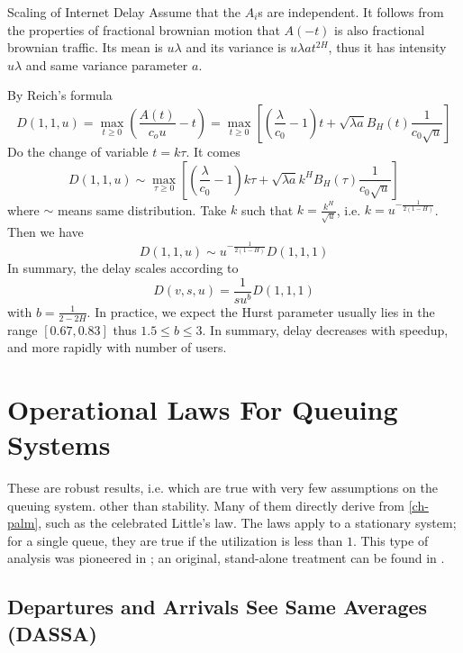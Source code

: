 \begin{ex}{Scaling of
Internet Delay}
Assume that the $A_i$s are independent. It follows from the properties of fractional brownian
motion that $A(-t)$ is also fractional brownian traffic. Its mean is $u \lambda$ and its
variance is $u \lambda a t^{2H}$, thus it has intensity $u\lambda$ and same variance parameter
$a$.

By Reich's formula
$$D(1,1,u)=\max_{t\geq 0}\left(\frac{A(t)}{c_o u}-t\right)=
\max_{t\geq 0}
 \left[\left(\frac{\lambda}{c_0}-1\right)t + \sqrt{\lambda a}B_H(t)\frac{1}{c_0\sqrt{u }}\right]
$$
Do the change of variable $t = k \tau$. It comes
$$D(1,1,u)\sim \max_{\tau \geq 0}
  \left[\left(\frac{\lambda}{c_0}-1\right)k\tau + \sqrt{\lambda a}k^HB_H(\tau)\frac{1}{c_0\sqrt{u}}\right]
$$
where $\sim$ means same distribution. Take $k$ such that $k=\frac{k^H}{\sqrt{u}}$, i.e.
$k=u^{-\frac{1}{2(1-H)}}$. Then we have
$$
D(1,1,u)\sim u^{-\frac{1}{2(1-H)}}D(1,1,1)
$$
In summary, the delay scales according to
$$
D(v,s,u)=\frac{1}{su^b}D(1,1,1)
$$
with $b=\frac{1}{2-2H}$. In practice, we expect the Hurst
parameter usually lies in the range $[0.67, 0.83]$ thus $1.5
\leq b \leq 3$. In summary, delay decreases with speedup, and
more rapidly with number of users.

\end{ex}

\section{Operational Laws For Queuing Systems}

 These are robust results, i.e. which are
true with very few assumptions on the queuing system. other
than stability. Many of them directly derive from
\cref{ch-palm}, such as the celebrated Little's law.  The laws
apply to a stationary system; for a single queue, they are true
if the utilization is less than $1$. This type of analysis was
pioneered in \cite{denning1978operational}; an original,
stand-alone treatment can be found in \cite{el1998sample}.



\subsection{Departures and Arrivals See Same Averages (DASSA)}

